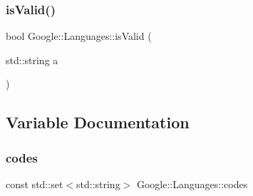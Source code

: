 \subsubsection{\texorpdfstring{is\+Valid()}{isValid()}}
{\footnotesize\ttfamily bool Google\+::\+Languages\+::is\+Valid (\begin{DoxyParamCaption}\item[{std\+::string}]{a }\end{DoxyParamCaption})}



\subsection{Variable Documentation}
\mbox{\label{a00036_a7323c7ef1fa5d84f505aa504095b788a}} 
\subsubsection{\texorpdfstring{codes}{codes}}
{\footnotesize\ttfamily const std\+::set$<$std\+::string$>$ Google\+::\+Languages\+::codes}

